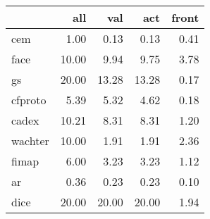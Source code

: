 \begin{tabular}{lrrrr}
\hline
{} &    all &    val &    act &  front \\ \hline
\hline
cem                 &   1.00 &   0.13 &   0.13 &   0.41 \\ \hline
face                &  10.00 &   9.94 &   9.75 &   3.78 \\ \hline
gs     &  20.00 &  13.28 &  13.28 &   0.17 \\ \hline
cfproto             &   5.39 &   5.32 &   4.62 &   0.18 \\ \hline
cadex               &  10.21 &   8.31 &   8.31 &   1.20 \\ \hline
wachter             &  10.00 &   1.91 &   1.91 &   2.36 \\ \hline
fimap               &   6.00 &   3.23 &   3.23 &   1.12 \\ \hline
ar &   0.36 &   0.23 &   0.23 &   0.10 \\ \hline
dice                &  20.00 &  20.00 &  20.00 &   1.94 \\ \hline
\hline
\end{tabular}
